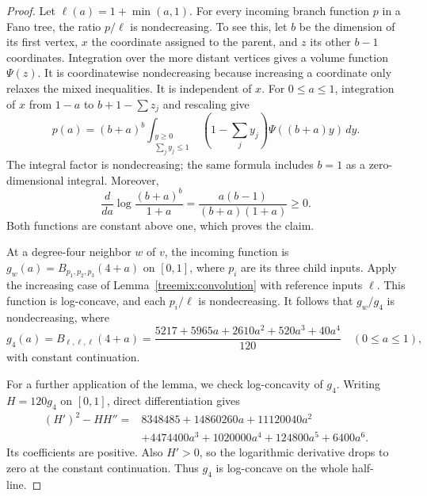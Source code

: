 \begin{proof}
Let $\ell(a)=1+\min(a,1)$. For every incoming branch function $p$ in a Fano tree, the ratio
$p/\ell$ is nondecreasing. To see this, let $b$ be
the dimension of its first vertex, $x$ the coordinate assigned to the
parent, and $z$ its other $b-1$ coordinates. Integration over the more distant vertices gives a volume function
$\Psi(z)$. It is coordinatewise nondecreasing because increasing a
coordinate only relaxes the mixed inequalities. It is
independent of $x$. For $0\le a\le1$, integration of $x$ from $1-a$ to
$b+1-\sum z_j$ and rescaling give
\[
 p(a)=(b+a)^b\int_{\substack{y\ge0\\\sum_j y_j\le1}}
                   (1-\textstyle\sum_j y_j)\Psi((b+a)y)\,dy.
\]
The integral factor is nondecreasing; the same formula includes $b=1$
as a zero-dimensional integral. Moreover,
\[
 \frac{d}{da}\log\frac{(b+a)^b}{1+a}
 =\frac{a(b-1)}{(b+a)(1+a)}\ge0.
\]
Both functions are constant above one, which proves the claim.

At a degree-four neighbor $w$ of $v$, the incoming function is
$g_w(a)=B_{p_1,p_2,p_3}(4+a)$ on $[0,1]$, where $p_i$ are its three
child inputs. Apply the increasing case of
Lemma~\ref{treemix:convolution} with reference inputs $\ell$.
This function is log-concave, and each $p_i/\ell$ is nondecreasing.
It follows that $g_w/g_4$ is nondecreasing, where
\begin{equation}\label{treemix:g-four}
 g_4(a)=B_{\ell,\ell,\ell}(4+a)
 =\frac{5217+5965a+2610a^2+520a^3+40a^4}{120}
 \quad(0\le a\le1),
\end{equation}
with constant continuation.

For a further application of the lemma, we check log-concavity of $g_4$.
Writing $H=120g_4$ on $[0,1]$, direct differentiation gives
\begin{align*}
 (H')^2-HH''={}&8348485+14860260a+11120040a^2\\
 &+4474400a^3+1020000a^4+124800a^5+6400a^6.
\end{align*}
Its coefficients are positive. Also $H'>0$, so the logarithmic
derivative drops to zero at the constant continuation. Thus $g_4$ is
log-concave on the whole half-line.


\end{proof}
